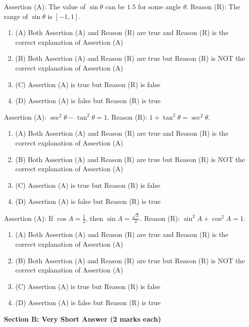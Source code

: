 \documentclass[12pt,a4paper]{exam}
\begin{document}
\begin{questions}
\question[1] Assertion (A): The value of $\sin \theta$ can be $1.5$ for some angle $\theta$. Reason (R): The range of $\sin \theta$ is $[-1, 1]$.
\begin{enumerate}[label=(\Alph*)]
  \item (A) Both Assertion (A) and Reason (R) are true and Reason (R) is the correct explanation of Assertion (A)
  \item (B) Both Assertion (A) and Reason (R) are true but Reason (R) is NOT the correct explanation of Assertion (A)
  \item (C) Assertion (A) is true but Reason (R) is false
  \item (D) Assertion (A) is false but Reason (R) is true
\end{enumerate}
\vspace{0.15cm}

\question[1] Assertion (A): $\sec^2 \theta - \tan^2 \theta = 1$. Reason (R): $1 + \tan^2 \theta = \sec^2 \theta$.
\begin{enumerate}[label=(\Alph*)]
  \item (A) Both Assertion (A) and Reason (R) are true and Reason (R) is the correct explanation of Assertion (A)
  \item (B) Both Assertion (A) and Reason (R) are true but Reason (R) is NOT the correct explanation of Assertion (A)
  \item (C) Assertion (A) is true but Reason (R) is false
  \item (D) Assertion (A) is false but Reason (R) is true
\end{enumerate}
\vspace{0.15cm}

\question[1] Assertion (A): If $\cos A = \frac{1}{2}$, then $\sin A = \frac{\sqrt{3}}{2}$. Reason (R): $\sin^2 A + \cos^2 A = 1$.
\begin{enumerate}[label=(\Alph*)]
  \item (A) Both Assertion (A) and Reason (R) are true and Reason (R) is the correct explanation of Assertion (A)
  \item (B) Both Assertion (A) and Reason (R) are true but Reason (R) is NOT the correct explanation of Assertion (A)
  \item (C) Assertion (A) is true but Reason (R) is false
  \item (D) Assertion (A) is false but Reason (R) is true
\end{enumerate}
\vspace{0.15cm}

\end{questions}
\bigskip
\noindent\textbf{\large Section B: Very Short Answer (2 marks each)}
\end{document}
